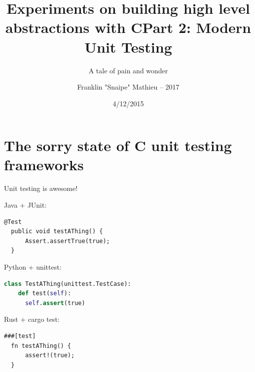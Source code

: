 \documentclass[10pt]{beamer}
\title{Experiments on building high level abstractions with C\newline\newline Part 2: Modern Unit Testing}
\subtitle{A tale of pain and wonder}
\date{4/12/2015}
\author{Franklin "Snaipe" Mathieu -- 2017}
\institute{EPITA -- GCONFS}
\begin{document}
\maketitle

\section{The sorry state of C unit testing frameworks}


\begin{frame}[fragile]{Unit testing is awesome!}

  Java + JUnit:

  \begin{lstlisting}[style=Java]
  @Test
  public void testAThing() {
      Assert.assertTrue(true);
  }
  \end{lstlisting}

  Python + unittest:

  \begin{lstlisting}[language=Python]
  class TestAThing(unittest.TestCase):
    def test(self):
      self.assert(true)
  \end{lstlisting}

  Rust + cargo test:
  \begin{lstlisting}[style=Rust]
  ###[test]
  fn testAThing() {
      assert!(true);
  }
  \end{lstlisting}

\end{frame}
\end{document}
